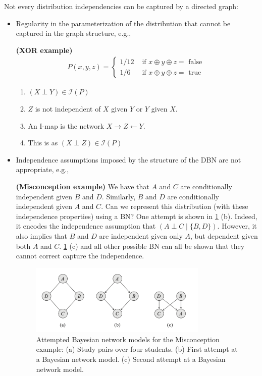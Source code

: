 \documentclass{article}
\newcommand{\bfs}[1]{\textbf{({#1}) }}
\begin{document}
Not every distribution independencies can be captured by a directed graph:
\begin{itemize}
    \item Regularity in the parameterization of the distribution that cannot be captured in the graph structure, e.g., 
    \begin{exma}\bfs{XOR example}
    \begin{align*}
P(x, y, z)= \begin{cases}1 / 12 & \text { if } x \oplus y \oplus z=\text { false } \\ 1 / 6 & \text { if } x \oplus y \oplus z=\text { true }\end{cases}
\end{align*}
\begin{enumerate}
    \item $(X \perp Y) \in \mathcal{I}(P)$
    \item $Z$ is not independent of $X$ given $Y$ or $Y$ given $X$.
    \item An I-map is the network $X \rightarrow Z \leftarrow Y$.
    \item This is  as $(X \perp Z) \in \mathcal{I}(P)$
\end{enumerate}
    \end{exma}
\item Independence assumptions imposed by the structure of the DBN are not appropriate, e.g., \begin{exma}\bfs{Misconception example}
\label{ex:miscon}
We have that $A$ and $C$ are conditionally independent given $B$ and $D$. Similarly, $B$ and $D$ are conditionally independent given $A$ and $C$. Can we represent this distribution (with these independence properties) using a BN? One attempt is shown in \cref{fig:mfsfyuh} (b). Indeed, it encodes the independence assumption that $(A \perp C \mid\{B, D\})$. However, it also implies that $B$ and $D$ are independent given only $A$, but dependent given both $A$ and $C$. \cref{fig:mfsfyuh} (c) and all other possible BN can all be shown that they cannot correct capture the independence.
\begin{figure}[H]
    \centering
    \includegraphics[width=0.8\textwidth]{Figs/a11.png}
    \caption{Attempted Bayesian network models for the Misconception example: (a) Study pairs over four students. (b) First attempt at a Bayesian network model. (c) Second attempt at a Bayesian network model.}
    \label{fig:mfsfyuh}
\end{figure}
\end{exma}

\end{itemize}
\end{document}
